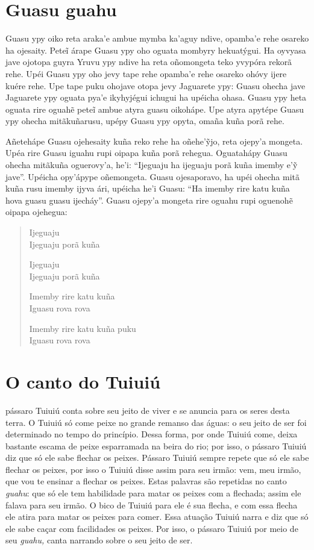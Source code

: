 \chapter{Guasu guahu}

Guasu ypy oiko reta araka'e ambue mymba ka'aguy ndive, opamba'e rehe
osareko ha ojesaity. Peteĩ árape Guasu ypy oho oguata mombyry
hekuatýgui. Ha oyvyasa jave ojotopa guyra Yruvu ypy ndive ha reta
oñomongeta teko yvypóra rekorã rehe. Upéi Guasu ypy oho jevy tape rehe
opamba'e rehe osareko ohóvy ijere kuére rehe. Upe tape puku ohojave
otopa jevy Jaguarete ypy: Guasu ohecha jave Jaguarete ypy oguata pya'e
ikyhyjégui ichugui ha upéicha ohasa. Guasu ypy heta oguata rire oguahẽ
peteĩ ambue atyra guasu oikohápe. Upe atyra apytépe Guasu ypy ohecha
mitãkuñarusu, upépy Guasu ypy opyta, omaña kuña porã rehe.

Añetehápe Guasu ojehesaity kuña reko rehe ha oñehe'ỹjo, reta ojepy'a
mongeta. Upéa rire Guasu iguahu rupi oipapa kuña porã rehegua.
Oguatahápy Guasu ohecha mitãkuña oguerovy'a, he'i: ``Ijeguaju ha
ijeguaju porã kuña imemby e'ỹ jave''. Upéicha opy'ápype oñemongeta.
Guasu ojesaporavo, ha upéi ohecha mitã kuña rusu imemby ijyva ári,
upéicha he'i Guasu: ``Ha imemby rire katu kuña hova guasu guasu
ijecháy''. Guasu ojepy'a mongeta rire oguahu rupi oguenohẽ oipapa
ojehegua:

\begin{verse}
Ijeguaju\\
Ijeguaju porã kuña

Ijeguaju\\
Ijeguaju porã kuña

Imemby rire katu kuña\\
Iguasu rova rova

Imemby rire katu kuña puku\\
Iguasu rova rova
\end{verse}

\chapter{O canto do Tuiuiú}

 pássaro Tuiuiú conta sobre seu jeito de viver e se anuncia para os
seres desta terra. O Tuiuiú só come peixe no grande remanso das águas: o
seu jeito de ser foi determinado no tempo do princípio. Dessa forma, por
onde Tuiuiú come, deixa bastante escama de peixe esparramada na beira do
rio; por isso, o pássaro Tuiuiú diz que só ele sabe flechar os peixes.
Pássaro Tuiuiú sempre repete que só ele sabe flechar os peixes, por isso
o Tuiuiú disse assim para seu irmão: vem, meu irmão, que vou te ensinar
a flechar os peixes. Estas palavras são repetidas no canto \emph{guahu}:
que só ele tem habilidade para matar os peixes com a flechada; assim ele
falava para seu irmão. O bico de Tuiuiú para ele é sua flecha, e com
essa flecha ele atira para matar os peixes para comer. Essa atuação
Tuiuiú narra e diz que só ele sabe caçar com facilidades os peixes. Por
isso, o pássaro Tuiuiú por meio de seu \emph{guahu,} canta narrando
sobre o seu jeito de ser.

